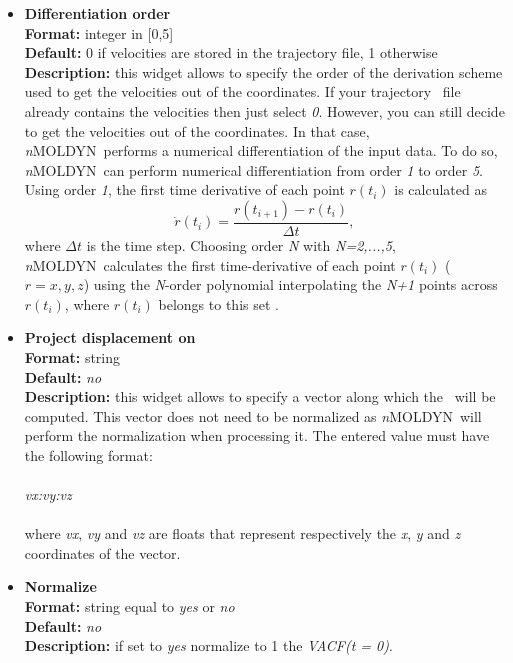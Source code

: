 \documentclass[a4paper,11pt]{report}
\newcommand{\NMOLDYN}{\textit{n}MOLDYN}
\begin{document}
\begin{itemize}
\hypertarget{vacf_differentiation_order}{}
\item \textbf{Differentiation order}\\
\textbf{Format:} integer in [0,5]\\
\textbf{Default:} 0 if velocities are stored in the trajectory file, 1 otherwise\\
\textbf{Description:} this widget allows to specify the order of the derivation scheme used to get the velocities out 
of the coordinates. If your trajectory \NetCDF\ file already contains the velocities then just select \textit{0}.
However, you can still decide to get the velocities out of the coordinates. In that case, \NMOLDYN\ performs a numerical 
differentiation of the input data. To do so, \NMOLDYN\ can perform numerical differentiation from order \textit{1} to 
order \textit{5}. Using order \textit{1}, the first time derivative of each point $r(t_i)$ 
is calculated as
\begin{equation}
\dot{r}(t_i)=\frac{r(t_{i+1})-r(t_{i})} {\Delta t},
\end{equation}
where $\Delta t$ is the time step. 
Choosing order \textit{N} with \textit{N=2,...,5}, \NMOLDYN\ calculates the first time-derivative of each point 
$r(t_i)$ ($r=x,y,z$) using the \textit{N}-order polynomial interpolating the \textit{N+1} points across $r(t_i)$, where $r(t_i)$ 
belongs to this set \cite{Abramowitz}.
\newpage
\hypertarget{vacf_project_displacement_on}{}
\item \textbf{Project displacement on}\\
\textbf{Format:} string\\
\textbf{Default:} \textit{no}\\
\textbf{Description:} this widget allows to specify a vector along which the \VACF\ will be computed. This vector does not 
need to be normalized as \NMOLDYN\ will perform the normalization when processing it. The entered value must have the 
following format:
\\\\
\textit{vx:vy:vz}
\\\\
where \textit{vx}, \textit{vy} and \textit{vz} are floats that represent respectively the \textit{x}, \textit{y} and \textit{z} coordinates of the vector.

\hypertarget{vacf_normalize}{}
\item \textbf{Normalize}\\
\textbf{Format:} string equal to \textit{yes} or \textit{no}\\
\textbf{Default:} \textit{no}\\
\textbf{Description:} if set to \textit{yes} normalize to 1 the \textit{VACF(t = 0)}.


\end{itemize}
\end{document}
